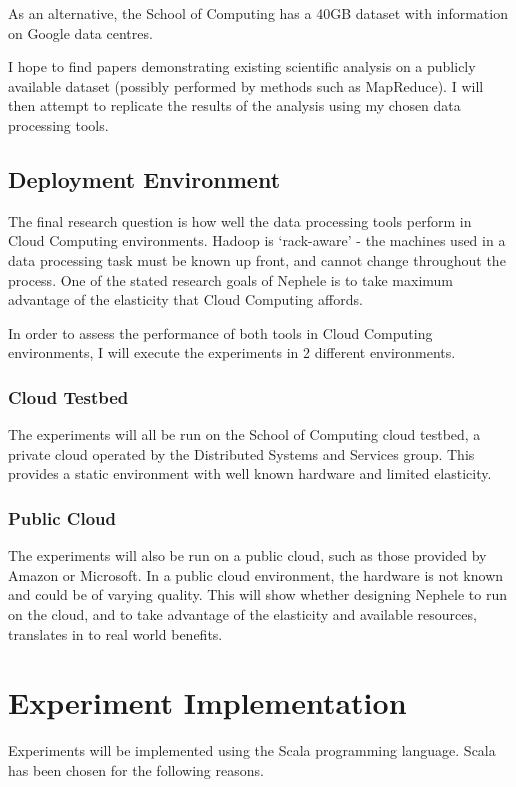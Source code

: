 As an alternative, the School of Computing has a 40GB dataset with information on Google data centres. 

I hope to find papers demonstrating existing scientific analysis on a publicly available dataset (possibly performed by methods such as MapReduce). I will then attempt to replicate the results of the analysis using my chosen data processing tools.

\subsection{Deployment Environment}
The final research question is how well the data processing tools perform in Cloud Computing environments. Hadoop is `rack-aware' - the machines used in a data processing task must be known up front, and cannot change throughout the process. One of the stated research goals of Nephele is to take maximum advantage of the elasticity that Cloud Computing affords.

In order to assess the performance of both tools in Cloud Computing environments, I will execute the experiments in 2 different environments.

\subsubsection{Cloud Testbed}
The experiments will all be run on the School of Computing cloud testbed, a private cloud operated by the Distributed Systems and Services group. This provides a static environment with well known hardware and limited elasticity. 

\subsubsection{Public Cloud}
The experiments will also be run on a public cloud, such as those provided by Amazon or Microsoft. In a public cloud environment, the hardware is not known and could be of varying quality. This will show whether designing Nephele to run on the cloud, and to take advantage of the elasticity and available resources, translates in to real world benefits.

\section{Experiment Implementation}
Experiments will be implemented using the Scala programming language. Scala has been chosen for the following reasons.

